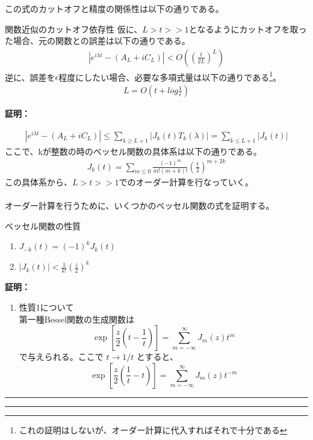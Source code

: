 \documentclass[a4paper,10.5pt]{article}
\numberwithin{equation}{section}
\newenvironment{proofbox}
{\begin{prooflabel}\textbf{証明：}\end{prooflabel}\vspace{0.8em}}
{\par\vspace{1em}\hrule\vspace{1em}}
\begin{document}
この式のカットオフと精度の関係性は以下の通りである。
\begin{resultbox}{関数近似のカットオフ依存性}
仮に、$L>t>>1$となるようにカットオフを取った場合、元の関数との誤差は以下の通りである。
\begin{align*}
    |e^{i\lambda t}-(A_{L}+iC_{L})|<O((\frac{t}{2L})^{L})
\end{align*}
逆に、誤差を$\epsilon$程度にしたい場合、必要な多項式量は以下の通りである\footnote{これの証明はしないが、オーダー計算に代入すればそれで十分である}。
\begin{align*}
    L=O(t+log\frac{1}{\epsilon})
\end{align*}
\end{resultbox}
\begin{proofbox}
    \begin{align*}
        |e^{i\lambda t}-(A_{L}+iC_{L})|\leq\sum_{k\geq L+1}|J_{k}(t)T_{k}(\lambda)|=\sum_{k\leq L+1}|J_{k}(t)|
    \end{align*}
    ここで、kが整数の時のベッセル関数の具体系は以下の通りである。
    \begin{align*}
        J_{k}(t)=\sum_{m\leq 0}\frac{(-1)^{m}}{m!(m+k)!}(\frac{t}{2})^{m+2k}
    \end{align*}
    この具体系から、$L>t>>1$でのオーダー計算を行なっていく。\\
    \\
    オーダー計算を行うために、いくつかのベッセル関数の式を証明する。
    \begin{resultbox}{ベッセル関数の性質}
        \begin{enumerate}
            \item $J_{-k}(t)=(-1)^{k}J_{k}(t)$
            \item $|J_{k}(t)|<\frac{1}{k!}(\frac{z}{2})^{k}$
        \end{enumerate}
    \end{resultbox}
    \begin{proofbox}
        \begin{enumerate}
            \item 性質1について\\
            第一種Bessel関数の生成関数は
\begin{equation}
\exp\left[\frac{z}{2}\left(t-\frac{1}{t}\right)\right]=\sum_{m=-\infty}^{\infty}J_m(z)t^m
\end{equation}
で与えられる。ここで $t\to 1/t$ とすると、
\begin{equation}
\exp\left[\frac{z}{2}\left(\frac{1}{t}-t\right)\right]=\sum_{m=-\infty}^{\infty}J_m(z)t^{-m}

\end{equation}
\end{enumerate}
\end{proofbox}
\end{proofbox}
\end{document}
